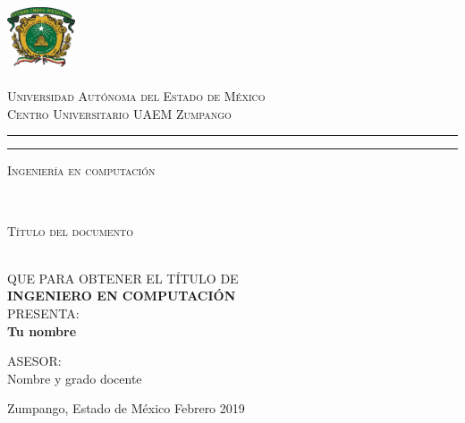 \thispagestyle{empty}
\begin{minipage}[c][0.1\textheight][c]{0.2\textwidth}
\begin{center}
    \includegraphics[width=2cm, height=2cm]{uaemex}
\end{center}
\end{minipage}
\begin{minipage}[c][0.1\textheight][t]{0.65\textwidth}
\begin{center}
    {\scshape Universidad Autónoma del Estado de México\\
    Centro Universitario UAEM   Zumpango}
    \vspace{.3cm}
    \hrule height2.5pt
    \vspace{.1cm}
    \hrule height1pt
    \vspace{.3cm}
    {\scshape  Ingeniería en computación}
\end{center}
\end{minipage}

\begin{minipage}[c][0.6\textheight][t]{0.2\textwidth}
\begin{center}
\hskip2pt
\vrule width2.5pt height10cm
        \hskip1mm
        \vrule width1pt height10cm \\
        \end{center}
\end{minipage}
\begin{minipage}[c][0.6\textheight][t]{0.65\textwidth}
  \begin{center}
   \vspace{2cm}
    {\Large \scshape {Título del documento}}

    \vspace{2cm}

      \\[8pt]
    QUE PARA OBTENER EL TÍTULO DE\\[5pt]
    {\large \textbf{{INGENIERO EN COMPUTACIÓN}}}\\[40pt]            
    PRESENTA:\\[5pt]
    \textbf{{Tu nombre}}

    \vspace{1cm}

    {\small ASESOR:\\ {Nombre y grado docente}}

    \vspace{0.9cm}

    {Zumpango, Estado de México}{ }{Febrero 2019}
  \end{center}
\end{minipage}
